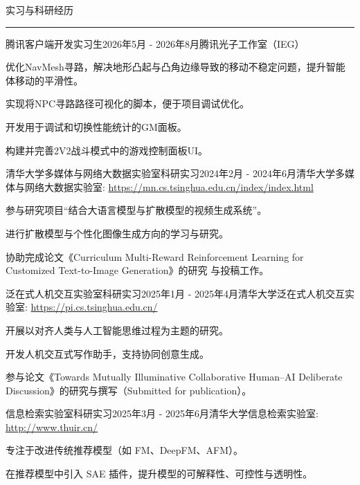 \documentclass{resume} %
\renewenvironment{rSection}[1]{
\sectionskip
\textcolor{TsinghuaPurple}{\MakeUppercase{#1}}
\sectionlineskip
\hrule
\begin{list}{}{
\setlength{\leftmargin}{0em}
}
\item[]
}{
\end{list}
}
\begin{document}
\begin{rSection}{实习与科研经历}

\begin{rSubsection}{腾讯客户端开发实习生}{2026年5月 - 2026年8月}{腾讯光子工作室（IEG）}{}
\item 优化NavMesh寻路，解决地形凸起与凸角边缘导致的移动不稳定问题，提升智能体移动的平滑性。
\item 实现将NPC寻路路径可视化的脚本，便于项目调试优化。
\item 开发用于调试和切换性能统计的GM面板。
\item 构建并完善2V2战斗模式中的游戏控制面板UI。
\end{rSubsection}

\begin{rSubsection}{清华大学多媒体与网络大数据实验室科研实习}{2024年2月 - 2024年6月}{清华大学多媒体与网络大数据实验室: \url{https://mn.cs.tsinghua.edu.cn/index/index.html}}{}
\item 参与研究项目“结合大语言模型与扩散模型的视频生成系统”。
\item 进行扩散模型与个性化图像生成方向的学习与研究。
\item 协助完成论文《Curriculum Multi-Reward Reinforcement Learning for Customized Text-to-Image Generation》的研究
与投稿工作。
\end{rSubsection}  

\begin{rSubsection}{泛在式人机交互实验室科研实习}{2025年1月 - 2025年4月}{清华大学泛在式人机交互实验室: \url{https://pi.cs.tsinghua.edu.cn/}}{}
\item 开展以对齐人类与人工智能思维过程为主题的研究。
\item 开发人机交互式写作助手，支持协同创意生成。
\item 参与论文《Towards Mutually Illuminative Collaborative Human--AI Deliberate Discussion》的研究与撰写（Submitted for publication）。
\end{rSubsection}  

\begin{rSubsection}{信息检索实验室科研实习}{2025年3月 - 2025年6月}{清华大学信息检索实验室: \url{http://www.thuir.cn/}}{}
\item 专注于改进传统推荐模型（如 FM、DeepFM、AFM）。
\item 在推荐模型中引入 SAE 插件，提升模型的可解释性、可控性与透明性。
\end{rSubsection}  

\end{rSection}
\end{document}
